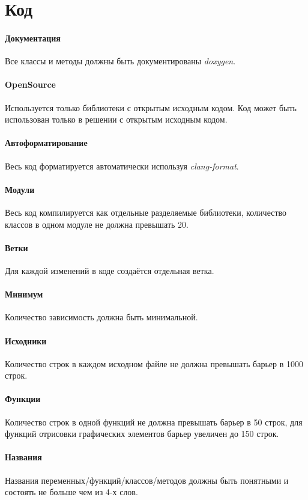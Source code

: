 \section{Код}

\paragraph{Документация}

Все классы и методы должны быть документированы \textit{doxygen}.

\paragraph{OpenSource}

Используется только библиотеки с открытым исходным кодом. Код может быть использован только в решении с открытым исходным кодом.

\paragraph{Автоформатирование}

Весь код форматируется автоматически используя \textit{clang-format}.

\paragraph{Модули}

Весь код компилируется как отдельные разделяемые библиотеки, количество классов в одном модуле не должна превышать 20.

\paragraph{Ветки}

Для каждой изменений в коде создаётся отдельная ветка.

\paragraph{Минимум}

Количество зависимость должна быть минимальной.

\paragraph{Исходники}

Количество строк в каждом исходном файле не должна превышать барьер в 1000 строк.

\paragraph{Функции}

Количество строк в одной функций не должна превышать барьер в 50 строк, для функций отрисовки графических элементов барьер увеличен до 150 строк.

\paragraph{Названия}

Названия переменных/функций/классов/методов должны быть понятными и состоять не больше чем из 4-х слов.
